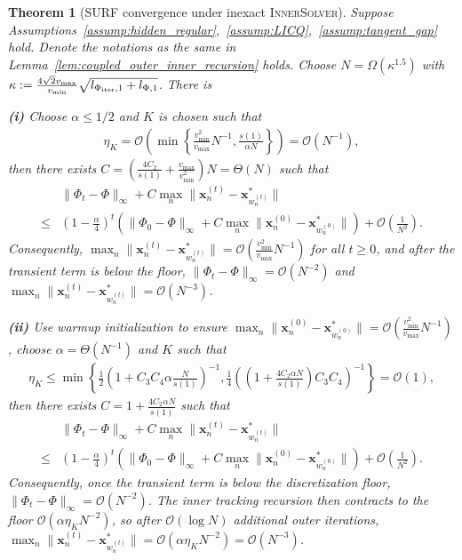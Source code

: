 \documentclass{article}
\newtheorem{theorem}{Theorem}
\newcommand{\Oc}{\mathcal{O}}
\newcommand{\bx}{\mathbf{x}}
\newcommand{\Farc}{\Phi}
\begin{document}
\begin{theorem}[SURF convergence under inexact \textsc{InnerSolver}]
\label{thm:warm_started_two_regimes}
Suppose Assumptions~\ref{assump:hidden_regular},~\ref{assump:LICQ},~\ref{assump:tangent_gap} hold. Denote the notations as the same in Lemma~\ref{lem:coupled_outer_inner_recursion} holds. Choose $N=\Omega(\kappa^{1.5})$ with $\kappa := \frac{4\sqrt{2}v_{\max}}{v_{\min}}\sqrt{l_{\Farc_{\rm iter},1}+l_{\Farc,1}}$. There is

\textbf{(i)} Choose $\alpha \leq 1/2$ and $K$ is chosen such that
\begin{align}
\eta_K=\Oc\left(\min\left\{\frac{v_{\min}^2}{v_{\max}}N^{-1},\frac{s(1)}{\alpha N}\right\}\right)=\Oc(N^{-1}),
\label{eq:etaK_constant_alpha_regime}
\end{align}
then there exists $C=\left(\frac{4C_2}{s(1)}+\frac{v_{\max}}{v_{\min}^2}\right)N=\Theta(N)$ such that
\begin{align}
&\|\Farc_t-\Farc\|_\infty+C\max_n\|\bx_n^{(t)}-\bx_{w_n^{(t)}}^*\| \nonumber\\
\leq&
\left(1-\frac{\alpha}{4}\right)^t\left(\|\Farc_0-\Farc\|_\infty+C\max_n\|\bx_n^{(0)}-\bx_{w_n^{(0)}}^*\|\right)+\Oc\left(\frac1{N^2}\right).
\label{eq:constant_alpha_regime_bound}
\end{align}
Consequently, $\max_n\|\bx_n^{(t)}-\bx_{w_n^{(t)}}^*\|=\Oc\left(\frac{v_{\min}^2}{v_{\max}}N^{-1}\right)$ for all $t\ge0$, and after the transient term is below the floor, $\|\Farc_t-\Farc\|_\infty=\Oc(N^{-2})$ and $\max_n\|\bx_n^{(t)}-\bx_{w_n^{(t)}}^*\|=\Oc(N^{-3})$.

\textbf{(ii)} Use warmup initialization to ensure $\max_n\|\bx_n^{(0)}-\bx_{w_n^{(0)}}^*\|=\Oc\left(\frac{v_{\min}^2}{v_{\max}}N^{-1}\right)$, choose $\alpha=\Theta(N^{-1})$ and $K$ such that
\begin{align}
\eta_K\le \min\left\{\frac12\left(1+C_3C_4\alpha\frac{N}{s(1)}\right)^{-1},\frac14\left(\left(1+\frac{4C_2\alpha N}{s(1)}\right)C_3C_4\right)^{-1}\right\}=\Oc(1),
\label{eq:etaK_small_alpha_regime}
\end{align}
then there exists $C=1+\frac{4C_2\alpha N}{s(1)}$ such that
\begin{align}
&\|\Farc_t-\Farc\|_\infty+C\max_n\|\bx_n^{(t)}-\bx_{w_n^{(t)}}^*\| \nonumber\\
\leq&
\left(1-\frac{\alpha}{4}\right)^t\left(\|\Farc_0-\Farc\|_\infty+C\max_n\|\bx_n^{(0)}-\bx_{w_n^{(0)}}^*\|\right)+\Oc\left(\frac1{N^2}\right).
\label{eq:small_alpha_regime_bound}
\end{align}
Consequently, once the transient term is below the discretization floor, $\|\Farc_t-\Farc\|_\infty=\Oc(N^{-2})$. The inner tracking recursion then contracts to the floor $\Oc(\alpha\eta_KN^{-2})$, so after $\Oc(\log N)$ additional outer iterations, $\max_n\|\bx_n^{(t)}-\bx_{w_n^{(t)}}^*\|=\Oc(\alpha\eta_KN^{-2})=\Oc(N^{-3})$.
\end{theorem}
\end{document}
